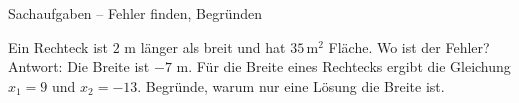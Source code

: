 \begin{aufgabe}{Sachaufgaben – Fehler finden, Begründen}
\begin{teile}
\teil Ein Rechteck ist $2$ m länger als breit und hat $35\,\text{m}^2$ Fläche. Wo ist der Fehler?  Antwort: Die Breite ist $-7$ m.
\teil Für die Breite eines Rechtecks ergibt die Gleichung $x_1 = 9$ und $x_2 = -13$. Begründe, warum nur eine Lösung die Breite ist.
\end{teile}
\end{aufgabe}
